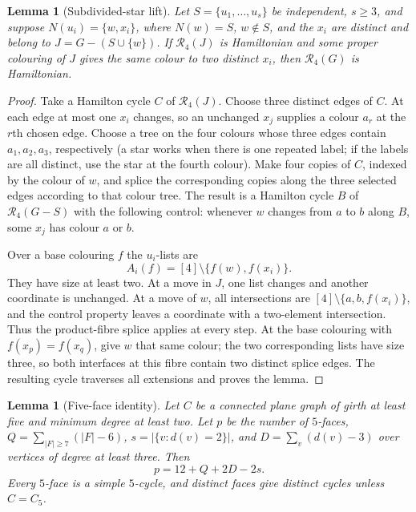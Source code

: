 \documentclass[11pt]{article}
\newtheorem{lemma}[theorem]{Lemma}
\theoremstyle{remark}
\newcommand{\R}{\mathcal R}
\numberwithin{equation}{section}
\numberwithin{table}{section}
\begin{document}
\begin{lemma}[Subdivided-star lift]
\label{lem:subdivided-star-four-subclass}
Let $S=\{u_1,\ldots,u_s\}$ be independent, $s\ge3$, and suppose
$N(u_i)=\{w,x_i\}$, where $N(w)=S$, $w\notin S$, and the $x_i$ are distinct and belong to
$J=G-(S\cup\{w\})$.  If $\R_4(J)$ is Hamiltonian and some proper colouring
of $J$ gives the same colour to two distinct $x_i$, then $\R_4(G)$ is
Hamiltonian.
\end{lemma}

\begin{proof}
Take a Hamilton cycle $C$ of $\R_4(J)$.  Choose three distinct edges of
$C$.  At each edge at most one $x_i$ changes, so an unchanged $x_j$ supplies
a colour $a_r$ at the $r$th chosen edge.  Choose a tree on the four colours
whose three edges contain $a_1,a_2,a_3$, respectively (a star works when
there is one repeated label; if the labels are all distinct, use the star
at the fourth colour).  Make four copies of $C$, indexed by the colour of
$w$, and splice the corresponding copies along the three selected edges
according to that colour tree.  The result is a Hamilton cycle $B$ of
$\R_4(G-S)$ with the following control: whenever $w$ changes from $a$ to $b$
along $B$, some $x_j$ has colour $a$ or $b$.

Over a base colouring $f$ the $u_i$-lists are
\[
 A_i(f)=[4]\setminus\{f(w),f(x_i)\}.
\]
They have size at least two.  At a move in $J$, one list changes and another
coordinate is unchanged.  At a move of $w$, all intersections are
$[4]\setminus\{a,b,f(x_i)\}$, and the control property leaves a coordinate
with a two-element intersection.  Thus the product-fibre splice applies at
every step.  At the base colouring with $f(x_p)=f(x_q)$, give $w$ that same
colour; the two corresponding lists have size three, so both interfaces at
this fibre contain two distinct splice edges.  The resulting cycle traverses
all extensions and proves the lemma.
\end{proof}

\begin{lemma}[Five-face identity]
\label{lem:five-face-identity-subclass}
Let $C$ be a connected plane graph of girth at least five and minimum degree
at least two.  Let $p$ be the number of $5$-faces,
$Q=\sum_{|F|\ge7}(|F|-6)$, $s=|\{v:d(v)=2\}|$, and
$D=\sum_v(d(v)-3)$ over vertices of degree at least three.  Then
\[
 p=12+Q+2D-2s.
\]
Every $5$-face is a simple $5$-cycle, and distinct faces give distinct
cycles unless $C=C_5$.
\end{lemma}
\end{document}

